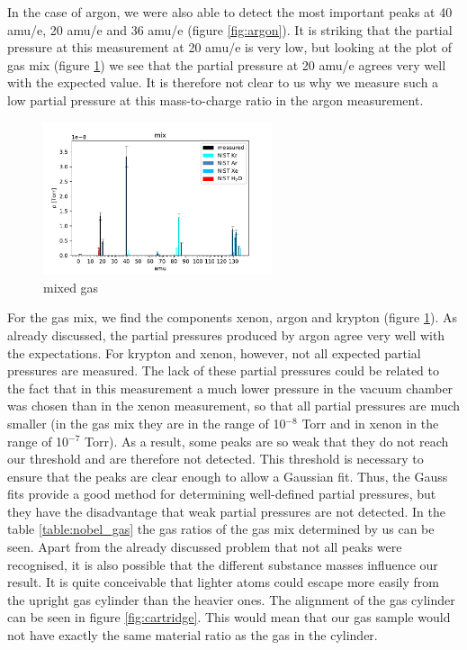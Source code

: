     In the case of argon, we were also able to detect the most important peaks at 40 amu/e, 20 amu/e and 36 amu/e (figure \ref{fig:argon}). It is striking that the partial pressure at this measurement at 20 amu/e is very low, but looking at the plot of gas mix (figure \ref{fig:mix})  we see that the partial pressure at 20 amu/e agrees very well with the expected value. It is therefore not clear to us why we measure such a low partial pressure at this mass-to-charge ratio in the argon measurement. 
    
     
    \begin{figure}[h!]
        \centering
        \includegraphics[width=0.6\textwidth]{Report/DataResultsPlots/mix.pdf}
        \caption{mixed gas}
        \label{fig:mix}
    \end{figure}
    
       For the gas mix, we find the components xenon, argon and krypton (figure \ref{fig:mix}). As already discussed, the partial pressures produced by argon agree very well with the expectations. For krypton and xenon, however, not all expected partial pressures are measured. The lack of these partial pressures could be related to the fact that in this measurement a much lower pressure in the vacuum chamber was chosen than in the xenon measurement, so that all partial pressures are much smaller (in the gas mix they are in the range of 10$^{-8}$ Torr and in xenon in the range of 10$^{-7}$ Torr). As a result, some peaks are so weak that they do not reach our threshold and are therefore not detected. This threshold is necessary to ensure that the peaks are clear enough to allow a Gaussian fit. Thus, the Gauss fits provide a good method for determining well-defined partial pressures, but they have the disadvantage that weak partial pressures are not detected. In the table \ref{table:nobel_gas} the gas ratios of the gas mix determined by us can be seen. Apart from the already discussed problem that not all peaks were recognised, it is also possible that the different substance masses influence our result. It is quite conceivable that lighter atoms could escape more easily from the upright gas cylinder than the heavier ones. The alignment of the gas cylinder can be seen in figure \ref{fig:cartridge}. This would mean that our gas sample would not have exactly the same material ratio as the gas in the cylinder.
    

